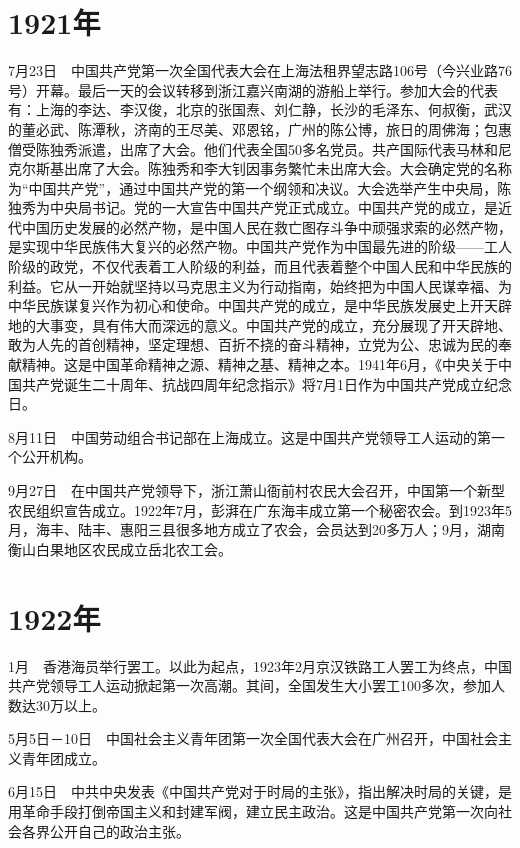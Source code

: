 \documentclass[10pt,a4paper,twocolumn]{book}
\begin{document}
\section{1921年}

7月23日　中国共产党第一次全国代表大会在上海法租界望志路106号（今兴业路76号）开幕。最后一天的会议转移到浙江嘉兴南湖的游船上举行。参加大会的代表有：上海的李达、李汉俊，北京的张国焘、刘仁静，长沙的毛泽东、何叔衡，武汉的董必武、陈潭秋，济南的王尽美、邓恩铭，广州的陈公博，旅日的周佛海；包惠僧受陈独秀派遣，出席了大会。他们代表全国50多名党员。共产国际代表马林和尼克尔斯基出席了大会。陈独秀和李大钊因事务繁忙未出席大会。大会确定党的名称为“中国共产党”，通过中国共产党的第一个纲领和决议。大会选举产生中央局，陈独秀为中央局书记。党的一大宣告中国共产党正式成立。中国共产党的成立，是近代中国历史发展的必然产物，是中国人民在救亡图存斗争中顽强求索的必然产物，是实现中华民族伟大复兴的必然产物。中国共产党作为中国最先进的阶级——工人阶级的政党，不仅代表着工人阶级的利益，而且代表着整个中国人民和中华民族的利益。它从一开始就坚持以马克思主义为行动指南，始终把为中国人民谋幸福、为中华民族谋复兴作为初心和使命。中国共产党的成立，是中华民族发展史上开天辟地的大事变，具有伟大而深远的意义。中国共产党的成立，充分展现了开天辟地、敢为人先的首创精神，坚定理想、百折不挠的奋斗精神，立党为公、忠诚为民的奉献精神。这是中国革命精神之源、精神之基、精神之本。1941年6月，《中央关于中国共产党诞生二十周年、抗战四周年纪念指示》将7月1日作为中国共产党成立纪念日。

8月11日　中国劳动组合书记部在上海成立。这是中国共产党领导工人运动的第一个公开机构。

9月27日　在中国共产党领导下，浙江萧山衙前村农民大会召开，中国第一个新型农民组织宣告成立。1922年7月，彭湃在广东海丰成立第一个秘密农会。到1923年5月，海丰、陆丰、惠阳三县很多地方成立了农会，会员达到20多万人；9月，湖南衡山白果地区农民成立岳北农工会。

\section{1922年}

1月　香港海员举行罢工。以此为起点，1923年2月京汉铁路工人罢工为终点，中国共产党领导工人运动掀起第一次高潮。其间，全国发生大小罢工100多次，参加人数达30万以上。

5月5日－10日　中国社会主义青年团第一次全国代表大会在广州召开，中国社会主义青年团成立。

6月15日　中共中央发表《中国共产党对于时局的主张》，指出解决时局的关键，是用革命手段打倒帝国主义和封建军阀，建立民主政治。这是中国共产党第一次向社会各界公开自己的政治主张。
\end{document}

